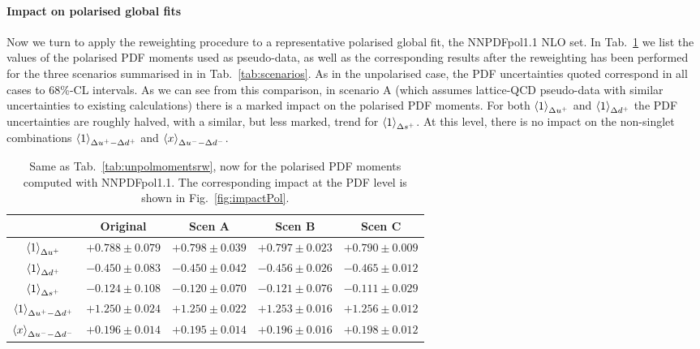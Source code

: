 \paragraph{Impact on polarised global fits}
%
Now we turn to apply the
reweighting procedure to a representative polarised
global fit, the NNPDFpol1.1 NLO set.
%
In Tab.~\ref{tab:polmomentsrw}
we list the values of the polarised PDF moments
  used as pseudo-data, as well as the corresponding results
  after the reweighting has been performed for the
three scenarios summarised in 
in Tab.~\ref{tab:scenarios}.
%
As in the unpolarised case, the PDF uncertainties quoted correspond in all cases to 
68\%-CL intervals.
%
As we can see from this comparison, in scenario A
(which assumes lattice-QCD pseudo-data with similar uncertainties
to existing calculations) there is a marked impact on the
polarised PDF moments.
%
For both $\left\langle 1\right\rangle_{\Delta u^+}$ and $\left\langle 1\right\rangle_{\Delta d^+}$
the PDF uncertainties are roughly halved, with a similar, but less marked,
trend for $\left\langle 1\right\rangle_{\Delta s^+}$.
%
At this level, there is no impact on the non-singlet
combinations $\left\langle 1\right\rangle_{\Delta u^+ - \Delta d^+}$
and $\left\langle x\right\rangle_{\Delta u^--\Delta d^-}$.

\begin{table}[t]
  \centering
  \renewcommand{\arraystretch}{1.4} 
\begin{tabular}{c||c||c|c|c}
  \hline &  Original  & Scen A  &  Scen B  & Scen C  \\
  \hline
  $\left\langle 1\right\rangle_{\Delta u^+}$    &  $+0.788\pm  0.079$   & $+0.798\pm  0.039$     &
  $+0.797\pm  0.023$ &   $+0.790\pm  0.009$ \\
  $\left\langle 1\right\rangle_{\Delta d^+}$   &  $-0.450 \pm 0.083$  &  $-0.450 \pm 0.042$  &
  $-0.456 \pm 0.026$    &  $-0.465 \pm 0.012$   \\
  $\left\langle 1\right\rangle_{\Delta s^+}$    &  $-0.124\pm   0.108 $  & $-0.120\pm   0.070 $  &
  $-0.121\pm   0.076 $    &   $-0.111\pm   0.029 $  \\
  $\left\langle 1\right\rangle_{\Delta u^+ - \Delta d^+}$  & $+1.250 \pm 0.024$   & $+1.250 \pm 0.022$  &
  $+1.253 \pm 0.016$ &    $+1.256 \pm 0.012$  \\
  $\left\langle x\right\rangle_{\Delta u^--\Delta d^-}$     & $+0.196 \pm 0.014$    & $+0.195 \pm 0.014$
  & $+0.196 \pm 0.016$     &  $+0.198 \pm 0.012$    \\
  \hline
\end{tabular}
\caption{\small Same as Tab.~\ref{tab:unpolmomentsrw}, now for
  the polarised PDF moments computed with NNPDFpol1.1.
  The corresponding impact at the PDF level is shown in
  Fig.~\ref{fig:impactPol}.
\label{tab:polmomentsrw}
}
\end{table}


